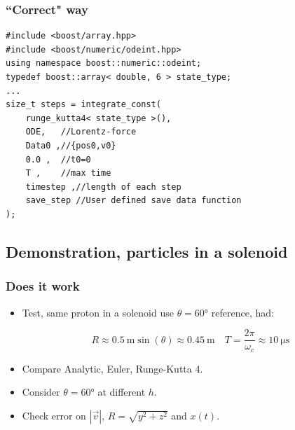 \documentclass{beamer}
\begin{document}
\begin{frame}[fragile]
\frametitle{``Correct" way}
\begin{lstlisting}
#include <boost/array.hpp>
#include <boost/numeric/odeint.hpp>
using namespace boost::numeric::odeint;
typedef boost::array< double, 6 > state_type;
...
size_t steps = integrate_const(
    runge_kutta4< state_type >(),
    ODE,   //Lorentz-force
    Data0 ,//{pos0,v0}
    0.0 ,  //t0=0
    T ,    //max time
    timestep ,//length of each step
    save_step //User defined save data function
);
\end{lstlisting}
\end{frame}

\subsection{Demonstration, particles in a solenoid}

\begin{frame}
\frametitle{Does it work}
\begin{itemize}

\item<1-> Test, same proton in a solenoid use $\theta=\ang{60}$ reference, had:

\begin{equation*}
R \approx \SI{0.5}{\meter}\sin(\theta)\approx \SI{0.45}{\meter} \quad T=\frac{2\pi}{\omega_c} \approx \SI{10}{\micro\second}
\end{equation*}

\item<2-> Compare Analytic, Euler, Runge-Kutta 4.

\item<3-> Consider $\theta=\ang{60}$ at different $h$.

\item<4-> Check error on $|\vec{v}|$, $R=\sqrt{y^2+z^2}$ and $x(t)$.
\end{itemize}
\end{frame}
\end{document}
